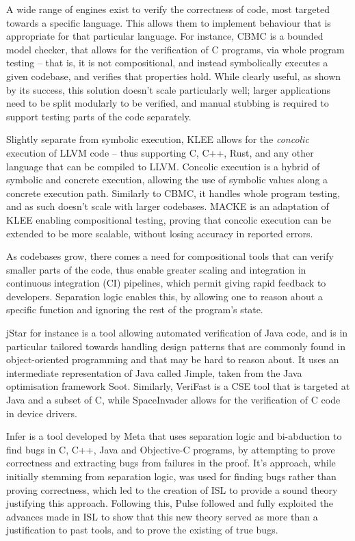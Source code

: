A wide range of engines exist to verify the correctness of code, most targeted towards a specific language. This allows them to implement behaviour that is appropriate for that particular language.
For instance, CBMC \cite{cbmc} is a bounded model checker, that allows for the verification of C programs, via whole program testing -- that is, it is not compositional, and instead symbolically executes a given codebase, and verifies that properties hold. While clearly useful, as shown by its success, this solution doesn't scale particularly well; larger applications need to be split modularly to be verified, and manual stubbing is required to support testing parts of the code separately.

Slightly separate from symbolic execution, KLEE \cite{klee} allows for the \emph{concolic} execution of LLVM code -- thus supporting C, C++, Rust, and any other language that can be compiled to LLVM. Concolic execution is a hybrid of symbolic and concrete execution, allowing the use of symbolic values along a concrete execution path. Similarly to CBMC, it handles whole program testing, and as such doesn't scale with larger codebases. MACKE \cite{macke} is an adaptation of KLEE enabling compositional testing, proving that concolic execution can be extended to be more scalable, without losing accuracy in reported errors.

As codebases grow, there comes a need for compositional tools that can verify smaller parts of the code, thus enable greater scaling and integration in continuous integration (CI) pipelines, which permit giving rapid feedback to developers. Separation logic enables this, by allowing one to reason about a specific function and ignoring the rest of the program's state.

jStar \cite{jstar} for instance is a tool allowing automated verification of Java code, and is in particular tailored towards handling design patterns that are commonly found in object-oriented programming and that may be hard to reason about. It uses an intermediate representation of Java called Jimple, taken from the Java optimisation framework Soot. Similarly, VeriFast \cite{verifast} is a CSE tool that is targeted at Java and a subset of C, while SpaceInvader \cite{spaceinvader} allows for the verification of C code in device drivers.

Infer \cite{infer} is a tool developed by Meta that uses separation logic and bi-abduction to find bugs in C, C++, Java and Objective-C programs, by attempting to prove correctness and extracting bugs from failures in the proof. It's approach, while initially stemming from separation logic, was used for finding bugs rather than proving correctness, which led to the creation of ISL \cite{isl} to provide a sound theory justifying this approach. Following this, Pulse \cite{pulse} followed and fully exploited the advances made in ISL to show that this new theory served as more than a justification to past tools, and to prove the existing of true bugs.

